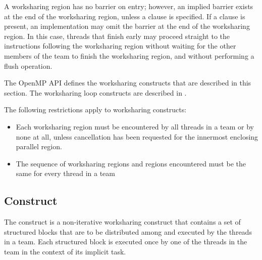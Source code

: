 A worksharing region has no barrier on entry; however, an implied barrier exists at the
end of the worksharing region, unless a  clause is specified. If a 
clause is present, an implementation may omit the barrier at the end of the worksharing
region. In this case, threads that finish early may proceed straight to the instructions
following the worksharing region without waiting for the other members of the team to
finish the worksharing region, and without performing a flush operation.

The OpenMP API defines the worksharing constructs that are described
in this section.  The worksharing loop constructs are described in .

\begin{samepage}
\restrictions
The following restrictions apply to worksharing constructs:

\begin{itemize}
\item Each worksharing region must be encountered by all threads in a team or by none at
all, unless cancellation has been requested for the innermost enclosing parallel
region.

\item The sequence of worksharing regions and  regions encountered must be the
same for every thread in a team
\end{itemize}
\end{samepage}










\subsection{ Construct}
\label{subsec:sections Construct}
\summary
The  construct is a non-iterative worksharing construct that contains a set of
structured blocks that are to be distributed among and executed by the threads in a team.
Each structured block is executed once by one of the threads in the team in the context
of its implicit task.

